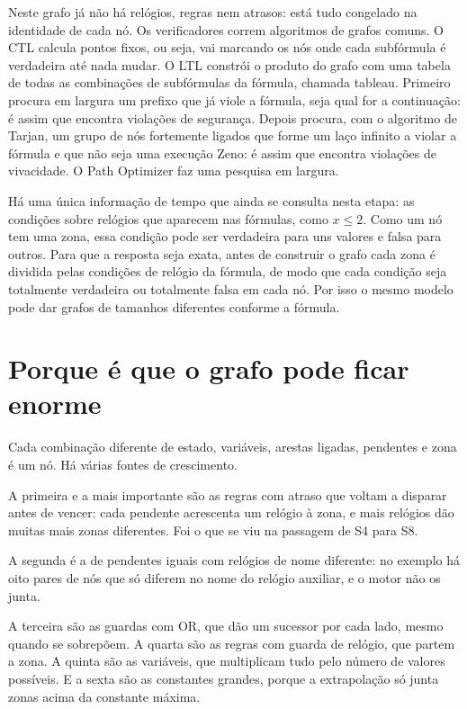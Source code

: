 \documentclass[11pt,a4paper]{article}
\begin{document}
Neste grafo já não há relógios, regras nem atrasos: está tudo congelado na identidade de cada nó. Os verificadores correm algoritmos de grafos comuns. O CTL calcula pontos fixos, ou seja, vai marcando os nós onde cada subfórmula é verdadeira até nada mudar. O LTL constrói o produto do grafo com uma tabela de todas as combinações de subfórmulas da fórmula, chamada tableau. Primeiro procura em largura um prefixo que já viole a fórmula, seja qual for a continuação: é assim que encontra violações de segurança. Depois procura, com o algoritmo de Tarjan, um grupo de nós fortemente ligados que forme um laço infinito a violar a fórmula e que não seja uma execução Zeno: é assim que encontra violações de vivacidade. O Path Optimizer faz uma pesquisa em largura.

Há uma única informação de tempo que ainda se consulta nesta etapa: as condições sobre relógios que aparecem nas fórmulas, como \(x \leq 2\). Como um nó tem uma zona, essa condição pode ser verdadeira para uns valores e falsa para outros. Para que a resposta seja exata, antes de construir o grafo cada zona é dividida pelas condições de relógio da fórmula, de modo que cada condição seja totalmente verdadeira ou totalmente falsa em cada nó. Por isso o mesmo modelo pode dar grafos de tamanhos diferentes conforme a fórmula.

\section{Porque é que o grafo pode ficar enorme}

Cada combinação diferente de estado, variáveis, arestas ligadas, pendentes e zona é um nó. Há várias fontes de crescimento.

A primeira e a mais importante são as regras com atraso que voltam a disparar antes de vencer: cada pendente acrescenta um relógio à zona, e mais relógios dão muitas mais zonas diferentes. Foi o que se viu na passagem de S4 para S8.

A segunda é a de pendentes iguais com relógios de nome diferente: no exemplo há oito pares de nós que só diferem no nome do relógio auxiliar, e o motor não os junta.

A terceira são as guardas com OR, que dão um sucessor por cada lado, mesmo quando se sobrepõem. A quarta são as regras com guarda de relógio, que partem a zona. A quinta são as variáveis, que multiplicam tudo pelo número de valores possíveis. E a sexta são as constantes grandes, porque a extrapolação só junta zonas acima da constante máxima.
\end{document}
